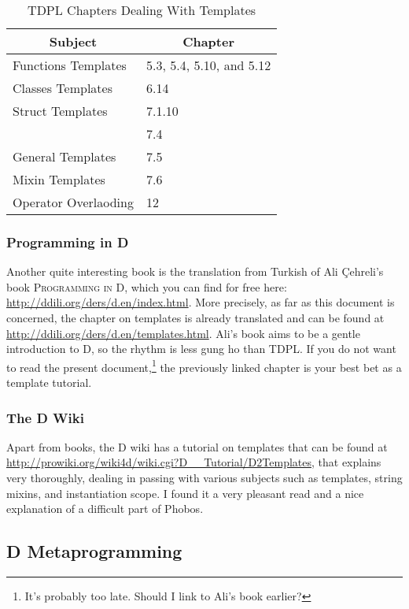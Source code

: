 \begin{table}[htb]
\centering
\begin{tabular}[c]{ll}
\hline
\multicolumn{1}{c}{Subject} & \multicolumn{1}{c}{Chapter} \\ \hline
Functions Templates & 5.3, 5.4, 5.10, and 5.12\\
Classes Templates & 6.14 \\
Struct Templates & 7.1.10 \\ 
\D{alias} & 7.4 \\ 
General Templates & 7.5 \\ 
Mixin Templates & 7.6 \\ 
Operator Overlaoding & 12 \\ \hline
\end{tabular}
\caption{TDPL Chapters Dealing With Templates}
\label{table:tdplchapters}
\end{table}

\subsubsection{Programming in D}
\label{programmingind}

Another quite interesting book is the translation from Turkish of Ali \c{C}ehreli's book \textsc{Programming in D}, which you can find for free here: \url{http://ddili.org/ders/d.en/index.html}. More precisely, as far as this document is concerned, the chapter on templates is already translated and can be found at \url{http://ddili.org/ders/d.en/templates.html}. Ali's book aims to be a gentle introduction to D, so the rhythm is less gung ho than TDPL. If you do not want to read the present document,\footnote{ It's probably too late. Should I link to Ali's book earlier?} the previously linked chapter is your best bet as a template tutorial.

\subsubsection{The D Wiki}
\label{dwiki}

Apart from books, the D wiki has a tutorial on templates that can be found at \url{http://prowiki.org/wiki4d/wiki.cgi?D__Tutorial/D2Templates}, that explains  very thoroughly, dealing in passing with various subjects such as templates, string mixins, and instantiation scope. I found it a very pleasant read and a nice explanation of a difficult part of Phobos.

\subsection{D Metaprogramming}
\label{dmetaprogramming}

